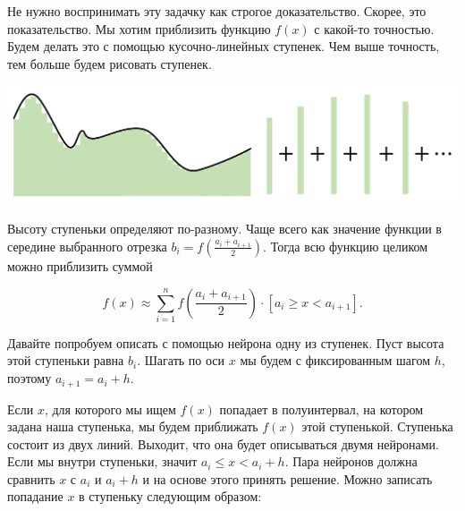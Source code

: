 \begin{sol}

Не нужно воспринимать эту задачку как строгое доказательство. Скорее, это показательство. Мы хотим приблизить функцию $f(x)$ с какой-то точностью. Будем делать это с помощью кусочно-линейных ступенек. Чем выше точность, тем больше будем рисовать ступенек.

\begin{center}
\includegraphics[scale=0.2]{images/steps.png}
\end{center}

Высоту ступеньки определяют по-разному. Чаще всего как значение функции в середине выбранного отрезка $b_i = f(\frac{a_i + a_{i+1}}{2})$. Тогда всю функцию целиком можно приблизить суммой

$$
f(x) \approx \sum_{i=1}^n f \left( \frac{a_i + a_{i+1}}{2} \right) \cdot [a_i \ge x < a_{i+1}].
$$

Давайте попробуем описать с помощью нейрона одну из ступенек. Пуст высота этой ступеньки равна $b_i$. Шагать по оси $x$ мы будем с фиксированным шагом $h$, поэтому $a_{i+1} = a_i + h$.

\begin{center}
\end{center}

Если $x$, для которого мы ищем $f(x)$ попадает в полуинтервал, на котором задана наша ступенька, мы будем приближать $f(x)$ этой ступенькой. Ступенька состоит из двух линий. Выходит, что она будет описываться двумя нейронами. Если мы внутри ступеньки, значит $a_i \le x < a_i + h$. Пара нейронов должна сравнить $x$ с $a_i$ и $a_i + h$ и на основе этого принять решение. Можно записать попадание $x$ в ступеньку следующим образом:


\end{sol}
